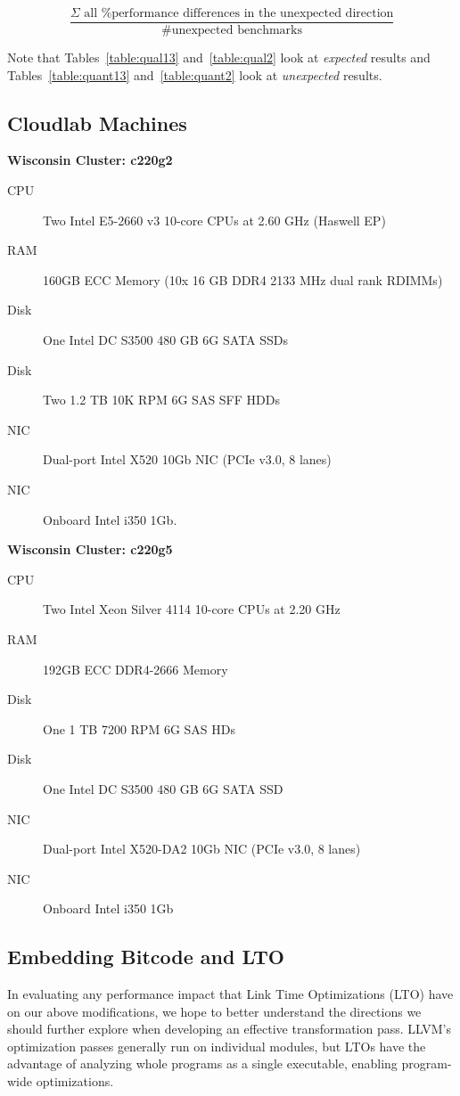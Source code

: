 \documentclass{article}
\begin{document}
$$
\frac{\Sigma \text{ all \% performance differences in the unexpected direction}}{\text{\# unexpected benchmarks}}
$$

\medskip
\noindent Note that Tables~\ref{table:qual13} and~\ref{table:qual2} look at \textit{expected} results and Tables~\ref{table:quant13} and~\ref{table:quant2} look at \textit{unexpected} results. 

\subsection{Cloudlab Machines}
\label{sec:hw}
\bigskip

\textbf{Wisconsin Cluster: c220g2}

\begin{description}
\item[CPU] Two Intel E5-2660 v3 10-core CPUs at 2.60 GHz (Haswell EP)
\item[RAM] 160GB ECC Memory (10x 16 GB DDR4 2133 MHz dual rank RDIMMs)
\item[Disk] One Intel DC S3500 480 GB 6G SATA SSDs
\item[Disk] Two 1.2 TB 10K RPM 6G SAS SFF HDDs
\item[NIC] Dual-port Intel X520 10Gb NIC (PCIe v3.0, 8 lanes)
\item[NIC] Onboard Intel i350 1Gb.
\end{description}
\bigskip

\noindent\textbf{Wisconsin Cluster: c220g5}

\begin{description}
\item[CPU] Two Intel Xeon Silver 4114 10-core CPUs at 2.20 GHz
\item[RAM] 192GB ECC DDR4-2666 Memory
\item[Disk] One 1 TB 7200 RPM 6G SAS HDs
\item[Disk] One Intel DC S3500 480 GB 6G SATA SSD
\item[NIC] Dual-port Intel X520-DA2 10Gb NIC (PCIe v3.0, 8 lanes)
\item[NIC] Onboard Intel i350 1Gb
\end{description}

\subsection{Embedding Bitcode and LTO}

In evaluating any performance impact that Link Time Optimizations (LTO) have on our above modifications, we hope to better understand the directions we should further explore when developing an effective transformation pass. 
%
LLVM's optimization passes generally run on individual modules, but LTOs have the advantage of analyzing whole programs as a single executable, enabling program-wide optimizations. 
%
\end{document}
